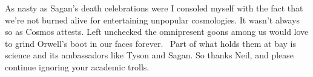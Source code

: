 As nasty as Sagan's death celebrations were I consoled myself with the
fact that we're not burned alive for entertaining unpopular cosmologies.
It wasn't always so as Cosmos attests. Left unchecked the omnipresent
goons among us would love to grind Orwell's boot in our faces forever.~
Part of what holds them at bay is science and its ambassadors like Tyson
and Sagan. So thanks Neil, and please continue ignoring your academic
trolls.




%